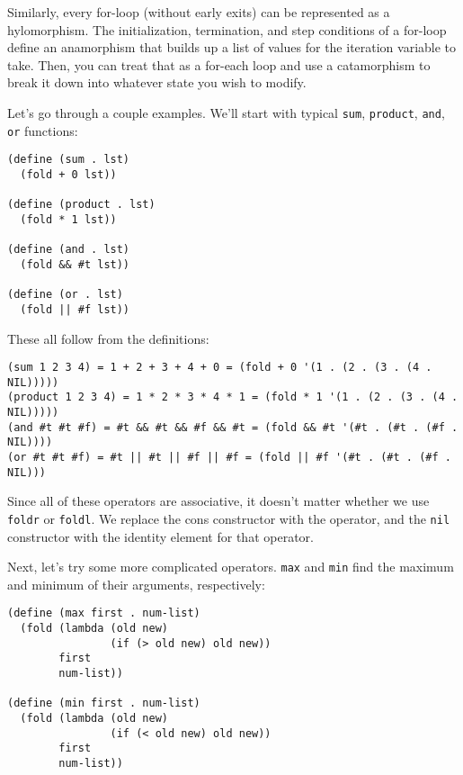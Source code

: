 Similarly, every for-loop (without early exits) can be represented as a hylomorphism. The initialization, termination, and step conditions of a for-loop define an anamorphism that builds up a list of values for the iteration variable to take. Then, you can treat that as a for-each loop and use a catamorphism to break it down into whatever state you wish to modify.
 
Let's go through a couple examples. We'll start with typical \verb|sum|, \verb|product|, \verb|and|, \verb|or| functions:
 
\begin{lstlisting}
(define (sum . lst)
  (fold + 0 lst))
 
(define (product . lst)
  (fold * 1 lst))
 
(define (and . lst)
  (fold && #t lst))
 
(define (or . lst)
  (fold || #f lst))
\end{lstlisting}
 
These all follow from the definitions:
 
\begin{lstlisting}
(sum 1 2 3 4) = 1 + 2 + 3 + 4 + 0 = (fold + 0 '(1 . (2 . (3 . (4 . NIL)))))
(product 1 2 3 4) = 1 * 2 * 3 * 4 * 1 = (fold * 1 '(1 . (2 . (3 . (4 . NIL)))))
(and #t #t #f) = #t && #t && #f && #t = (fold && #t '(#t . (#t . (#f . NIL))))
(or #t #t #f) = #t || #t || #f || #f = (fold || #f '(#t . (#t . (#f . NIL)))
\end{lstlisting}
 
Since all of these operators are associative, it doesn't matter whether we use \verb|foldr| or \verb|foldl|. We replace the cons constructor with the operator, and the \verb|nil| constructor with the identity element for that operator.
 
Next, let's try some more complicated operators. \verb|max| and \verb|min| find the maximum and minimum of their arguments, respectively:
 
\begin{lstlisting}
(define (max first . num-list)
  (fold (lambda (old new)
                (if (> old new) old new))
        first
        num-list))
 
(define (min first . num-list)
  (fold (lambda (old new)
                (if (< old new) old new))
        first
        num-list))
\end{lstlisting}
 
